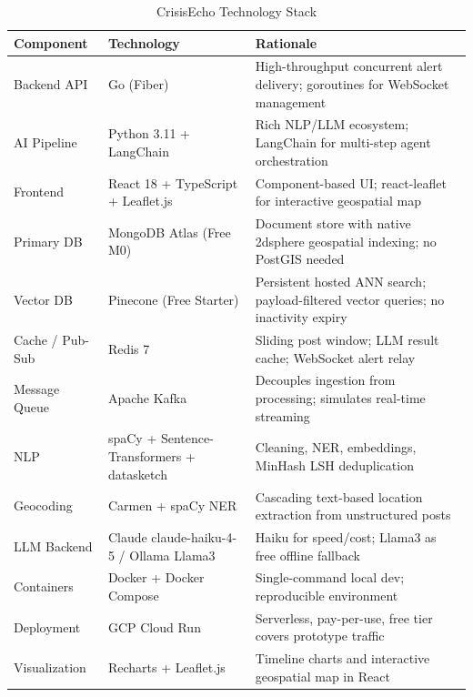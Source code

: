 \documentclass[conference]{IEEEtran}
\begin{document}
\begin{table}[h]
\caption{CrisisEcho Technology Stack}
\label{tab:techstack}
\renewcommand{\arraystretch}{1.2}
\begin{tabular}{p{1.4cm} p{2.2cm} p{4.0cm}}
\toprule
\textbf{Component} & \textbf{Technology} & \textbf{Rationale} \\
\midrule
Backend API & Go (Fiber) & High-throughput concurrent alert delivery; goroutines for WebSocket management \\
AI Pipeline & Python 3.11 + LangChain & Rich NLP/LLM ecosystem; LangChain for multi-step agent orchestration \\
Frontend & React 18 + TypeScript + Leaflet.js & Component-based UI; react-leaflet for interactive geospatial map \\
Primary DB & MongoDB Atlas (Free M0) & Document store with native 2dsphere geospatial indexing; no PostGIS needed \\
Vector DB & Pinecone (Free Starter) & Persistent hosted ANN search; payload-filtered vector queries; no inactivity expiry \\
Cache / Pub-Sub & Redis 7 & Sliding post window; LLM result cache; WebSocket alert relay \\
Message Queue & Apache Kafka & Decouples ingestion from processing; simulates real-time streaming \\
NLP & spaCy + Sentence-Transformers + datasketch & Cleaning, NER, embeddings, MinHash LSH deduplication \\
Geocoding & Carmen + spaCy NER & Cascading text-based location extraction from unstructured posts \\
LLM Backend & Claude claude-haiku-4-5 / Ollama Llama3 & Haiku for speed/cost; Llama3 as free offline fallback \\
Containers & Docker + Docker Compose & Single-command local dev; reproducible environment \\
Deployment & GCP Cloud Run & Serverless, pay-per-use, free tier covers prototype traffic \\
Visualization & Recharts + Leaflet.js & Timeline charts and interactive geospatial map in React \\
\bottomrule
\end{tabular}
\end{table}
\end{document}
